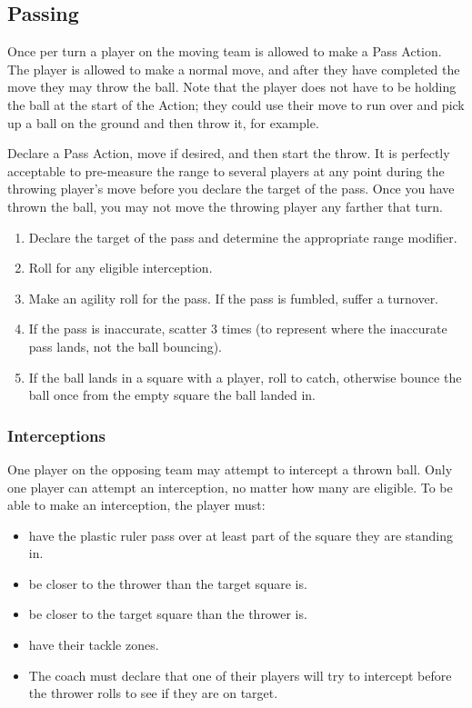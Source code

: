 \documentclass{article}
\begin{document}
\begin{multicols}{2}
\subsection{Passing}
\par Once per turn a player on the moving team is allowed to make a Pass Action. The player is allowed to make a normal move, and after they have completed the move they may throw the ball. Note that the player does not have to be holding the ball at the start of the Action; they could use their move to run over and pick up a ball on the ground and then throw it, for example.
\par Declare a Pass Action, move if desired, and then start the throw. It is perfectly acceptable to pre-measure the range to several players at any point during the throwing player's move before you declare the target of the pass. Once you have thrown the ball, you may not move the throwing player any farther that turn.

\begin{enumerate}
\item Declare the target of the pass and determine the appropriate range modifier.
\item Roll for any eligible interception.
\item Make an agility roll for the pass. If the pass is fumbled, suffer a turnover.
\item If the pass is inaccurate, scatter 3 times (to represent where the inaccurate pass lands, not the ball bouncing).
\item If the ball lands in a square with a player, roll to catch, otherwise bounce the ball once from the empty square the ball landed in.
\end{enumerate}

\subsubsection{Interceptions}
\par One player on the opposing team may attempt to intercept a thrown ball. Only one player can attempt an interception, no matter how many are eligible. To be able to make an interception, the player must:

\begin{itemize}
\item have the plastic ruler pass over at least part of the square they are standing in.
\item be closer to the thrower than the target square is.
\item be closer to the target square than the thrower is.
\item have their tackle zones.
\item The coach must declare that one of their players will try to intercept before the thrower rolls to see if they are on target.
\end{itemize}


\end{multicols}
\end{document}
